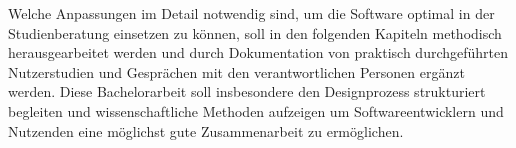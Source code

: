 Welche Anpassungen im Detail notwendig sind, um die Software optimal in der
Studienberatung einsetzen zu können, soll in den folgenden Kapiteln methodisch
herausgearbeitet werden und durch Dokumentation von praktisch durchgeführten
Nutzerstudien und Gesprächen mit den verantwortlichen Personen ergänzt werden.
Diese Bachelorarbeit soll insbesondere den Designprozess strukturiert begleiten
und wissenschaftliche Methoden aufzeigen um Softwareentwicklern und Nutzenden
eine möglichst gute Zusammenarbeit zu ermöglichen.